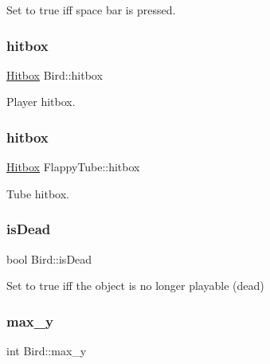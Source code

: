 Set to true iff space bar is pressed. 

\mbox{\label{group__flappy_ga22c913a0e2c2eb7faceaf256ffc2a21f}} 
\subsubsection{\texorpdfstring{hitbox}{hitbox}\hspace{0.1cm}{\footnotesize\ttfamily [1/2]}}
{\footnotesize\ttfamily \mbox{\hyperlink{struct_hitbox}{Hitbox}} Bird\+::hitbox}



Player hitbox. 

\mbox{\label{group__flappy_ga6c57c0cbff50d942c40410631ae3eba2}} 
\subsubsection{\texorpdfstring{hitbox}{hitbox}\hspace{0.1cm}{\footnotesize\ttfamily [2/2]}}
{\footnotesize\ttfamily \mbox{\hyperlink{struct_hitbox}{Hitbox}} Flappy\+Tube\+::hitbox}



Tube hitbox. 

\mbox{\label{group__flappy_gaf4f24b08e29e948d98b6014bb745c395}} 
\subsubsection{\texorpdfstring{is\+Dead}{isDead}}
{\footnotesize\ttfamily bool Bird\+::is\+Dead}



Set to true iff the object is no longer playable (dead) 

\mbox{\label{group__flappy_ga4f989e709d0c300ac4fdd9e29a8d3307}} 
\subsubsection{\texorpdfstring{max\+\_\+y}{max\_y}}
{\footnotesize\ttfamily int Bird\+::max\+\_\+y}



